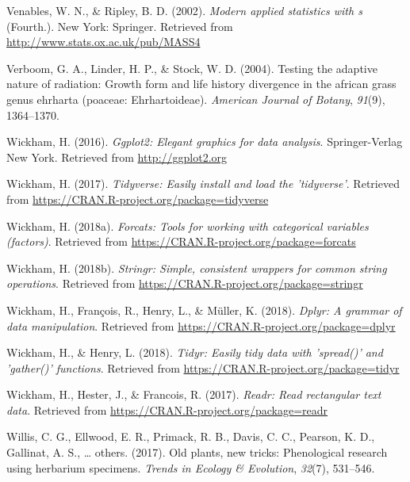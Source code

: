 \documentclass[man,floatsintext]{apa6}
\theoremstyle{definition}
\theoremstyle{definition}
\theoremstyle{definition}
\theoremstyle{remark}
\begin{document}
\leavevmode\hypertarget{ref-R-MASS}{}%
Venables, W. N., \& Ripley, B. D. (2002). \emph{Modern applied
statistics with s} (Fourth.). New York: Springer. Retrieved from
\url{http://www.stats.ox.ac.uk/pub/MASS4}

\leavevmode\hypertarget{ref-verboom2004testing}{}%
Verboom, G. A., Linder, H. P., \& Stock, W. D. (2004). Testing the
adaptive nature of radiation: Growth form and life history divergence in
the african grass genus ehrharta (poaceae: Ehrhartoideae).
\emph{American Journal of Botany}, \emph{91}(9), 1364--1370.

\leavevmode\hypertarget{ref-R-ggplot2}{}%
Wickham, H. (2016). \emph{Ggplot2: Elegant graphics for data analysis}.
Springer-Verlag New York. Retrieved from \url{http://ggplot2.org}

\leavevmode\hypertarget{ref-R-tidyverse}{}%
Wickham, H. (2017). \emph{Tidyverse: Easily install and load the
'tidyverse'}. Retrieved from
\url{https://CRAN.R-project.org/package=tidyverse}

\leavevmode\hypertarget{ref-R-forcats}{}%
Wickham, H. (2018a). \emph{Forcats: Tools for working with categorical
variables (factors)}. Retrieved from
\url{https://CRAN.R-project.org/package=forcats}

\leavevmode\hypertarget{ref-R-stringr}{}%
Wickham, H. (2018b). \emph{Stringr: Simple, consistent wrappers for
common string operations}. Retrieved from
\url{https://CRAN.R-project.org/package=stringr}

\leavevmode\hypertarget{ref-R-dplyr}{}%
Wickham, H., François, R., Henry, L., \& Müller, K. (2018). \emph{Dplyr:
A grammar of data manipulation}. Retrieved from
\url{https://CRAN.R-project.org/package=dplyr}

\leavevmode\hypertarget{ref-R-tidyr}{}%
Wickham, H., \& Henry, L. (2018). \emph{Tidyr: Easily tidy data with
'spread()' and 'gather()' functions}. Retrieved from
\url{https://CRAN.R-project.org/package=tidyr}

\leavevmode\hypertarget{ref-R-readr}{}%
Wickham, H., Hester, J., \& Francois, R. (2017). \emph{Readr: Read
rectangular text data}. Retrieved from
\url{https://CRAN.R-project.org/package=readr}

\leavevmode\hypertarget{ref-willis2017old}{}%
Willis, C. G., Ellwood, E. R., Primack, R. B., Davis, C. C., Pearson, K.
D., Gallinat, A. S., \ldots{} others. (2017). Old plants, new tricks:
Phenological research using herbarium specimens. \emph{Trends in Ecology
\& Evolution}, \emph{32}(7), 531--546.
\end{document}
